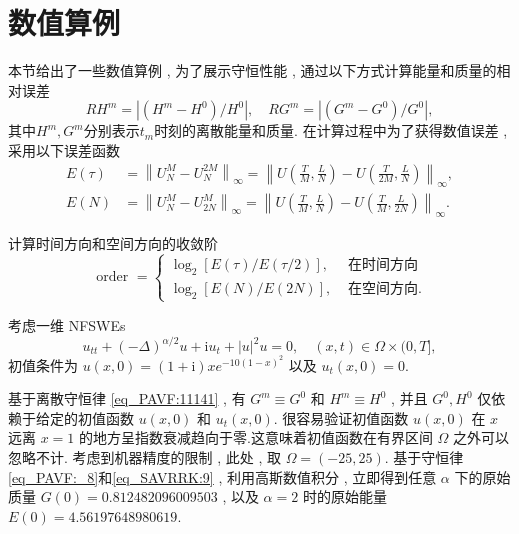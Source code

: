 \section{数值算例}\label{Section_PAVF: 4}

本节给出了一些数值算例 , 为了展示守恒性能 , 通过以下方式计算能量和质量的相对误差
\begin{equation}\label{eq_PAVF:105}
R H^{m}=\left|\left(H^{m}-H^{0}\right) / H^{0}\right| , \quad R G^{m}=\left|\left(G^{m}-G^{0}\right) / G^{0}\right| , 
\end{equation}
其中$H^{m} , G^{m}$分别表示$t_{m}$时刻的离散能量和质量.
在计算过程中为了获得数值误差 , 采用以下误差函数
\begin{align}\label{eq_PAVF:103}
E(\tau)&=\left\|U_{N}^{M}-U_{N}^{2 M}\right\|_{\infty}=\left\|U\left(\frac{T}{M} , \frac{L}{N}\right)-U\left(\frac{T}{2 M} , \frac{L}{N}\right)\right\|_{\infty} , \nonumber\\
E(N)&=\left\|U_{N}^{M}-U_{2 N}^{M}\right\|_{\infty}=\left\|U\left(\frac{T}{M} , \frac{L}{N}\right)-U\left(\frac{T}{M} , \frac{L}{2 N}\right)\right\|_{\infty}.
\end{align}

计算时间方向和空间方向的收敛阶
\begin{equation}
\text { order }= \left\{
\begin{aligned}
\log _{2}[E(\tau) / E(\tau / 2)] , & \text { 在时间方向 } \\
\log _{2}[E(N) / E(2 N)] , & \text { 在空间方向.}
\end{aligned}\right.\label{eq_PAVF:104}
\end{equation}

\begin{example}\label{exp_PAVF:2}
	考虑一维 NFSWEs
	\begin{equation}\label{eq_PAVF:108}
	u_{t t}+(-\Delta)^{\alpha / 2} u+\mathrm{i}u_t+|u|^2 u=0 , \quad (x , t)\in  \Omega\times(0 , T] , 
	\end{equation}
	初值条件为 $u(x , 0)=(1+\mathrm{i}) x e^{-10(1-x)^2}$ 以及 $u_t(x , 0)=0$.
\end{example}

	基于离散守恒律 \eqref{eq_PAVF:11141} , 有 $G^{m}\equiv G^0$ 和 $H^{m}\equiv H^0$ , 并且 $G^0 , H^0$ 仅依赖于给定的初值函数 $u(x , 0)$ 和 $u_t(x , 0)$.
	很容易验证初值函数 $u(x , 0)$ 在 $x$ 远离 $x=1$ 的地方呈指数衰减趋向于零.这意味着初值函数在有界区间 $\Omega$ 之外可以忽略不计.
	考虑到机器精度的限制 , 此处 , 取 $\Omega=(-25 , 25)$.
	基于守恒律 \eqref{eq_PAVF:_8}和\eqref{eq_SAVRRK:9} , 利用高斯数值积分 , 立即得到任意 $\alpha$ 下的原始质量 $G(0)=0.812482096009503$ , 以及 $\alpha=2$ 时的原始能量 $E(0)=4.56197648980619$.


